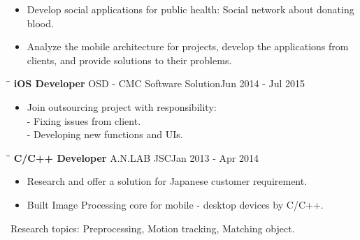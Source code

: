 \documentclass[margin, 10pt]{res}
\begin{document}
\begin{resume}
   \begin{itemize}
   	\item Develop social applications for public health: Social network about donating blood.
		\item Analyze the mobile architecture for projects, develop the applications 
      from clients, and provide solutions to their problems.
   \end{itemize}

   \begin{tabbing}
   \hspace{2.0in}\= \hspace{2.0in}\= \kill %
   {\bf iOS Developer} \>OSD - CMC  Software Solution\>Jun 2014 - Jul 2015\\
   \end{tabbing}\vspace{-20pt} %

   \begin{itemize}
   		\item Join outsourcing project with responsibility: \\ - Fixing issues from client. \\ - Developing new functions and UIs. 
		
   \end{itemize}

   \begin{tabbing}
   \hspace{2.0in}\= \hspace{2.0in}\= \kill %
   {\bf C/C++ Developer} \>A.N.LAB JSC\>Jan 2013 - Apr 2014\\
   \end{tabbing}\vspace{-20pt} %

   \begin{itemize}
   		\item Research and offer a solution for Japanese customer requirement. 
		\item Built Image Processing core for mobile - desktop devices by C/C++.		
		
   \end{itemize}
   Research topics: Preprocessing, Motion tracking, Matching object.
	

\end{resume}
\end{document}
